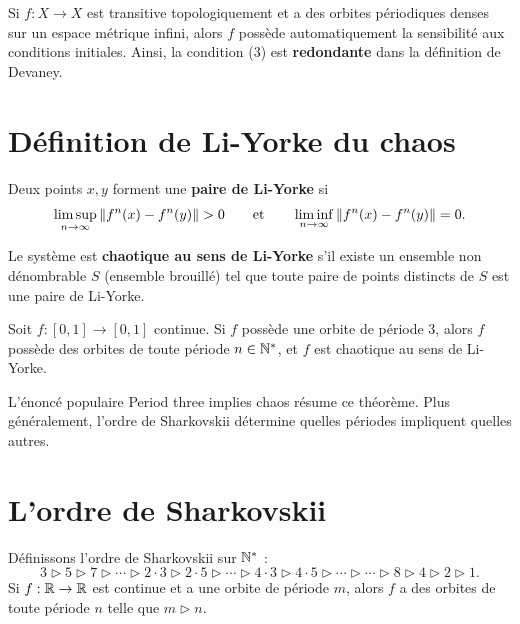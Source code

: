 \begin{theoreme}[Banks et al., 1992]
Si $f : X \to X$ est transitive topologiquement et a des orbites p\'eriodiques
denses sur un espace m\'etrique infini, alors $f$ poss\`ede automatiquement
la sensibilit\'e aux conditions initiales. Ainsi, la condition (3) est
\textbf{redondante} dans la d\'efinition de Devaney.
\end{theoreme}

\section{D\'efinition de Li-Yorke du chaos}

\begin{definition}
Deux points $x, y$ forment une \textbf{paire de Li-Yorke} si
\[
    \limsup_{n \to \infty} \left\| f^n(x) - f^n(y) \right\| > 0 \qquad \text{et} \qquad
    \liminf_{n \to \infty} \left\| f^n(x) - f^n(y) \right\| = 0.
\]
\end{definition}

\begin{definition}
Le syst\`eme est \textbf{chaotique au sens de Li-Yorke} s'il existe un
ensemble non d\'enombrable $S$ (ensemble brouill\'e) tel que toute paire
de points distincts de $S$ est une paire de Li-Yorke.
\end{definition}

\begin{theoreme}[Li-Yorke, 1975]
\label{thm:li-yorke}
Soit $f : [0,1] \to [0,1]$ continue. Si $f$ poss\`ede une orbite de
p\'eriode 3, alors $f$ poss\`ede des orbites de toute p\'eriode $n \in \mathbb{N}^*$,
et $f$ est chaotique au sens de Li-Yorke.
\end{theoreme}

\begin{remarque}
L'\'enonc\'e populaire \og Period three implies chaos \fg r\'esume ce
th\'eor\`eme. Plus g\'en\'eralement, l'ordre de Sharkovskii d\'etermine
quelles p\'eriodes impliquent quelles autres.
\end{remarque}

\section{L'ordre de Sharkovskii}

\begin{theoreme}[Sharkovskii, 1964]
D\'efinissons l'ordre de Sharkovskii sur $\mathbb{N}^*$ :
\[
    3 \triangleright 5 \triangleright 7 \triangleright \cdots \triangleright
    2\cdot 3 \triangleright 2\cdot 5 \triangleright \cdots \triangleright
    4\cdot 3 \triangleright 4\cdot 5 \triangleright \cdots \triangleright
    \cdots \triangleright 8 \triangleright 4 \triangleright 2 \triangleright 1.
\]
Si $f : \mathbb{R} \to \mathbb{R}$ est continue et a une orbite de p\'eriode $m$, alors $f$
a des orbites de toute p\'eriode $n$ telle que $m \triangleright n$.
\end{theoreme}

